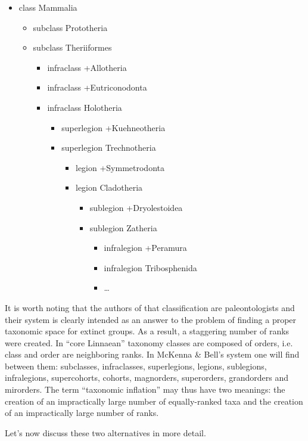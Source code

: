 \begin{artengenv}
\begin{itemize}
\item class Mammalia
\begin{itemize}
\item subclass Prototheria
\item subclass Theriiformes
\begin{itemize}
\item infraclass +Allotheria
\item infraclass +Eutriconodonta
\item infraclass Holotheria
\begin{itemize}
\item superlegion +Kuehneotheria
\item superlegion Trechnotheria
\begin{itemize}
\item legion +Symmetrodonta
\item legion Cladotheria
\begin{itemize}
\item sublegion +Dryolestoidea
\item sublegion Zatheria
\begin{itemize}
\item infralegion +Peramura
\item infralegion Tribosphenida
\item \ldots
\end{itemize}
\end{itemize}
\end{itemize}
\end{itemize}
\end{itemize}
\end{itemize}
\end{itemize}
It is worth noting that the authors of that classification are paleontologists and their system is clearly intended as
an answer to the problem of finding a proper taxonomic space for extinct groups. As a result, a staggering number of
ranks were created. In “core Linnaean” taxonomy classes are composed of orders, i.e. class and order are neighboring
ranks. In McKenna \& Bell’s system one will find between them: subclasses, infraclasses, superlegions, legions,
sublegions, infralegions, supercohorts, cohorts, magnorders, superorders, grandorders and mirorders. The term
“taxonomic inflation” may thus have two meanings: the creation of an impractically large number of equally-ranked taxa
and the creation of an impractically large number of ranks.

Let’s now discuss these two alternatives in more detail.


\end{artengenv}
